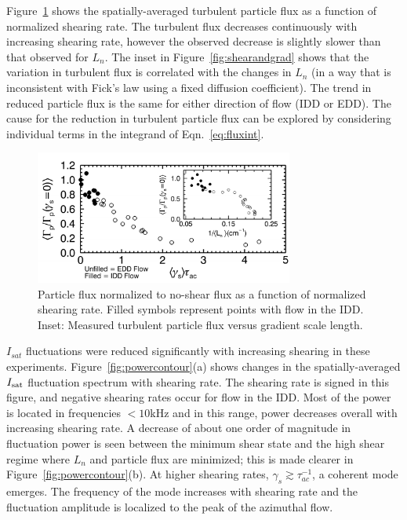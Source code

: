 \documentclass[aps,prl,amsmath,amssymb,preprint,superscriptaddress]{revtex4}
\begin{document}
Figure~\ref{fig:fluxvsshear} shows the spatially-averaged turbulent
particle flux as a function of normalized shearing rate.  The
turbulent flux decreases continuously with increasing shearing rate,
however the observed decrease is slightly slower than that observed
for $L_n$.  The inset in Figure~\ref{fig:shearandgrad} shows that the variation in
turbulent flux is correlated with the changes in $L_n$ (in a way
that is inconsistent with Fick's law using a fixed diffusion coefficient).  The
trend in reduced particle flux is the same for either direction of
flow (IDD or EDD).  The cause for the reduction in turbulent particle
flux can be explored by considering individual terms in the integrand
of Eqn.~\ref{eq:fluxint}.


\begin{figure}[!htbp]
\centerline{
\includegraphics[width=8.5cm]{fluxvsshear}}
\caption{\label{fig:fluxvsshear} Particle flux normalized to no-shear
  flux as a function of normalized shearing rate. Filled symbols
  represent points with flow in the IDD. Inset: Measured turbulent particle flux versus
  gradient scale length.}
\end{figure}


$I_{sat}$ fluctuations were reduced significantly with increasing
shearing in these experiments.  Figure~\ref{fig:powercontour}(a) shows
changes in the spatially-averaged $I_{\rm sat}$ fluctuation spectrum
with shearing rate.  The shearing rate is signed in this figure, and
negative shearing rates occur for flow in the IDD. Most of the power
is located in frequencies $<10$kHz and in this range, power decreases
overall with increasing shearing rate.  A decrease of about one order
of magnitude in fluctuation power is seen between the minimum shear
state and the high shear regime where $L_n$ and particle flux are
minimized; this is made clearer in Figure~\ref{fig:powercontour}(b).  At
higher shearing rates, $\gamma_{s} \gtrsim \tau_{ac}^{-1}$, a coherent
mode emerges.  The frequency of the mode increases with shearing rate
and the fluctuation amplitude is localized to the peak of the
azimuthal flow.
\end{document}
